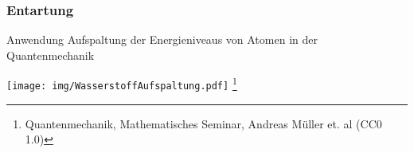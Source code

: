 \documentclass[ngerman, aspectratio=169]{beamer}
\begin{document}
	\begin{frame}
        \frametitle{Entartung}
		\begin{block}{Anwendung}
			Aufspaltung der Energieniveaus von Atomen in der Quantenmechanik
			\begin{center}
				\texttt{[image: img/WasserstoffAufspaltung.pdf]}
				\footnote{Quantenmechanik, Mathematisches Seminar, Andreas Müller et. al (CC0 1.0)}
			\end{center}
		\end{block}
	\end{frame}
\end{document}
